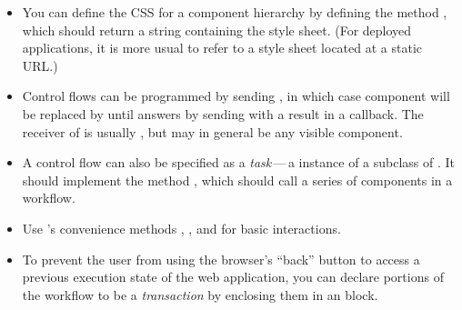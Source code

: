 \documentclass[a4paper,10pt,twoside]{book}
\begin{document}
\begin{itemize}
  \item You can define the CSS for a component hierarchy by defining the method , which should return a string containing the style sheet.
  (For deployed applications, it is more usual to refer to a style sheet located at a static URL.)
  \item Control flows can be programmed by sending , in which case component  will be replaced by  until  answers by sending  with a result in a callback.
  The receiver of  is usually , but may in general be any visible component.
  \item A control flow can also be specified as a \emph{task}\,---\,a instance of a subclass of . It should implement the method , which should call a series of components in a workflow.
  \item Use 's convenience methods , ,  and  for basic interactions.
  \item To prevent the user from using the browser's ``back'' button to access a previous execution state of the web application, you can declare portions of the workflow to be a \emph{transaction} by enclosing them in an  block.
\end{itemize}

\ifx\wholebook\relax\else 
   
   
\end{document}
